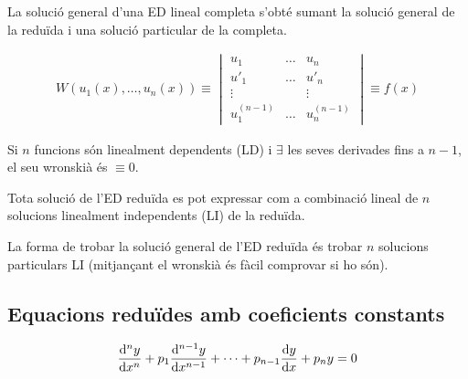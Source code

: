 \begin{thm}
	La solució general d'una ED lineal completa s'obté sumant la solució general de la reduïda i una solució particular de la completa.
\end{thm}
\begin{defi}[Wronskià]
	\begin{align}
		W(u_{1}(x), \dots , u_{n}(x)) \equiv \begin{vmatrix} u_{1} & \dots & u_{n} \\ u'_{1} & \dots & u'_{n} \\ \vdots & & \vdots \\ u^{(n-1)}_{1} & \dots & u^{(n-1)}_{n} \end{vmatrix} \equiv f(x)
	\end{align}
\end{defi}
\begin{thm}
	Si $n$ funcions són linealment dependents (LD) i $\exists$ les seves derivades fins a $n-1$, el seu wronskià és $\equiv 0$.
\end{thm}
\begin{thm}
	Tota solució de l'ED reduïda es pot expressar com a combinació lineal de $n$ solucions linealment independents (LI) de la reduïda.
\end{thm}
\begin{cor}
	La forma de trobar la solució general de l'ED reduïda és trobar $n$ solucions particulars LI (mitjançant el wronskià és fàcil comprovar si ho són).
\end{cor}

\subsection{Equacions reduïdes amb coeficients constants}
\begin{defi}
	\begin{align}\label{ed-red-ct-n}
		\frac{\mathrm{d}^{n} y}{\mathrm{d} x^{n}} + p_{1} \frac{\mathrm{d}^{n-1} y}{\mathrm{d} x^{n-1}} + \dots + p_{n-1} \frac{\mathrm{d} y}{\mathrm{d} x} + p_{n} y = 0
	\end{align}
\end{defi}

